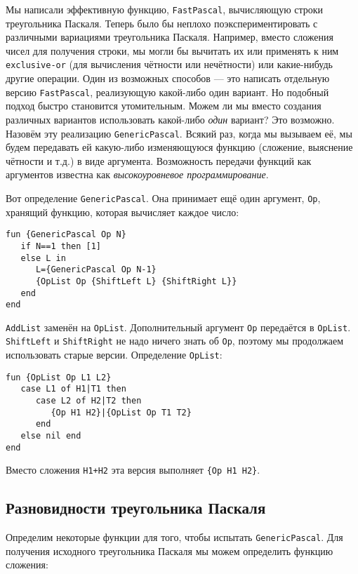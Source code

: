 Мы написали эффективную функцию, \lstinline|FastPascal|, вычисляющую строки треугольника Паскаля. Теперь было бы неплохо поэкспериментировать с различными вариациями треугольника Паскаля. Например, вместо сложения чисел для получения строки, мы могли бы вычитать их или применять к ним \lstinline|exclusive-or| (для вычисления чётности или нечётности) или какие-нибудь другие операции. Один из возможных способов --- это написать отдельную версию \lstinline|FastPascal|, реализующую какой-либо один вариант. Но подобный подход быстро становится утомительным. Можем ли мы вместо создания различных вариантов использовать какой-либо \emph{один} вариант? Это возможно. Назовём эту реализацию \lstinline|GenericPascal|. Всякий раз, когда мы вызываем её, мы будем передавать ей какую-либо изменяющуюся функцию (сложение, выяснение чётности и т.д.) в виде аргумента. Возможность передачи функций как аргументов известна как \emph{высокоуровневое программирование}.

Вот определение \lstinline|GenericPascal|. Она принимает ещё один аргумент, \lstinline|Op|, хранящий функцию, которая вычисляет каждое число:



\begin{lstlisting}
fun {GenericPascal Op N}
   if N==1 then [1]
   else L in
      L={GenericPascal Op N-1}
      {OpList Op {ShiftLeft L} {ShiftRight L}}
   end
end
\end{lstlisting}


\lstinline|AddList| заменён на \lstinline|OpList|. Дополнительный аргумент \lstinline|Op| передаётся в \lstinline|OpList|. \lstinline|ShiftLeft| и \lstinline|ShiftRight| не надо ничего знать об \lstinline|Op|, поэтому мы продолжаем использовать старые версии. Определение \lstinline|OpList|:

\begin{lstlisting}
fun {OpList Op L1 L2}
   case L1 of H1|T1 then
      case L2 of H2|T2 then
         {Op H1 H2}|{OpList Op T1 T2}
      end
   else nil end
end
\end{lstlisting}


Вместо сложения \lstinline|H1+H2| эта версия выполняет \lstinline|{Op H1 H2}|.

\subsection{Разновидности треугольника Паскаля}

Определим некоторые функции для того, чтобы испытать \lstinline|GenericPascal|. Для получения исходного треугольника Паскаля мы можем определить функцию сложения:

